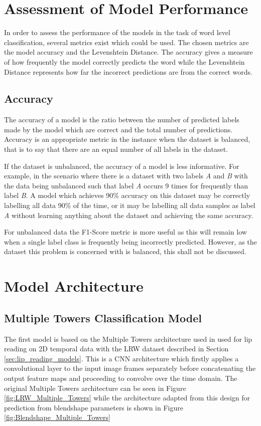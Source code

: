 \section{Assessment of Model Performance}\label{sec:class_assessment}
In order to assess the performance of the models in the task of word level classification, several metrics exist which could be used.
The chosen metrics are the model accuracy and the Levenshtein Distance.
The accuracy gives a measure of how frequently the model correctly predicts the word while the Levenshtein Distance represents how far the incorrect predictions are from the correct words.

\subsection{Accuracy}
The accuracy of a model is the ratio between the number of predicted labels made by the model which are correct and the total number of predictions.
Accuracy is an appropriate metric in the instance when the dataset is balanced, that is to say that there are an equal number of all labels in the dataset.

If the dataset is unbalanced, the accuracy of a model is less informative.
For example, in the scenario where there is a dataset with two labels \textit{A} and \textit{B} with the data being unbalanced such that label \textit{A} occurs 9 times for frequently than label \textit{B}.
A model which achieves 90\% accuracy on this dataset may be correctly labelling all data 90\% of the time, or it may be labelling all data samples as label \textit{A} without learning anything about the dataset and achieving the same accuracy.

For unbalanced data the F1-Score metric is more useful as this will remain low when a single label class is frequently being incorrectly predicted.
However, as the dataset this problem is concerned with is balanced, this shall not be discussed.

\section{Model Architecture}

\subsection{Multiple Towers Classification Model}\label{sec:multi_towers_model}
The first model is based on the Multiple Towers architecture used in \cite{Chung2016} used for lip reading on 2D temporal data with the LRW dataset described in Section \ref{sec:lip_reading_models}.
This is a CNN architecture which firstly applies a convolutional layer to the input image frames separately before concatenating the output feature maps and proceeding to convolve over the time domain.
The original Multiple Towers architecture can be seen in Figure \ref{fig:LRW_Multiple_Towers} while the architecture adapted from this design for prediction from blendshape parameters is shown in Figure \ref{fig:Blendshape_Multiple_Towers}

